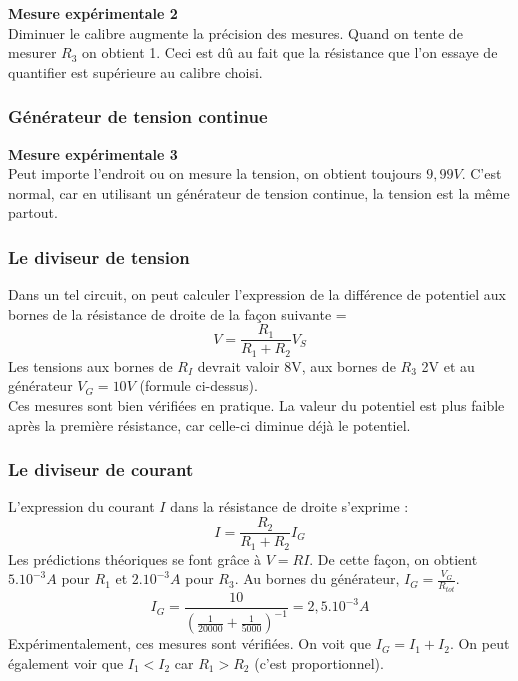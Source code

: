 \documentclass[british,french,11pt, a4paper, openany]{book}
\begin{document}
		\textbf{Mesure expérimentale 2}\\
		Diminuer le calibre augmente la précision des mesures. Quand on tente de mesurer $R_3$ on obtient 1. Ceci est dû au fait que la résistance que l'on essaye de quantifier est supérieure au calibre choisi.
		
		\subsubsection*{Générateur de tension continue}
		\textbf{Mesure expérimentale 3}\\
		Peut importe l'endroit ou on mesure la tension, on obtient toujours $9,99 V$. C'est normal, car en utilisant un générateur de tension continue, la tension est la même partout.
		
		\subsubsection*{Le diviseur de tension}
		Dans un tel circuit, on peut calculer l'expression de la différence de potentiel aux bornes de la résistance de droite de la façon suivante = 
		\begin{equation}
			V = \frac{R_1}{R_1 + R_2}V_S
		\end{equation}
		Les tensions aux bornes de $R_I$ devrait valoir 8V, aux bornes de $R_3$ 2V et au générateur $V_G = 10V$ (formule ci-dessus).\\
		Ces mesures sont bien vérifiées en pratique. La valeur du potentiel est plus faible après la première résistance, car celle-ci diminue déjà le potentiel.
		
		\subsubsection*{Le diviseur de courant}
		L'expression du courant $I$ dans la résistance de droite s'exprime : 
		\begin{equation}
			I = \frac{R_2}{R_1 + R_2}I_G
		\end{equation}
		Les prédictions théoriques se font grâce à $V = RI$. De cette façon, on obtient $5.10^{-3} A$ pour $R_1$ et $2.10^{-3} A$ pour $R_3$. Au bornes du générateur, $I_G = \frac{V_G}{R_{tot}}
		$.
		\begin{equation}
			I_G = \frac{10}{\left(\frac{1}{20000} + \frac{1}{5000} \right)^{-1}} = 2,5.10^{-3} A
		\end{equation}
		Expérimentalement, ces mesures sont vérifiées. On voit que $I_G = I_1 + I_2$. 
		On peut également voir que $I_1 < I_2$ car $R_1 > R_2$ (c'est proportionnel).
		
\end{document}
